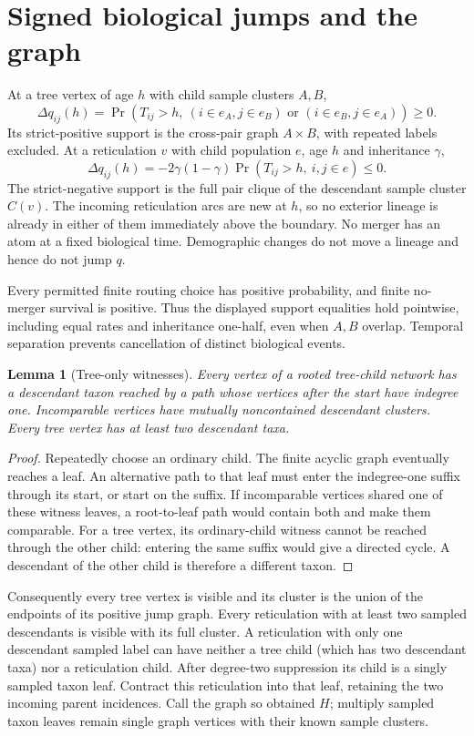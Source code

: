 \documentclass[11pt]{article}
\newtheorem{lemma}[theorem]{Lemma}
\begin{document}
\section{Signed biological jumps and the graph}
\label{sec:graph}
At a tree vertex of age $h$ with child sample clusters $A,B$,
\[
 \Delta q_{ij}(h)=\Pr(T_{ij}>h,\ (i\in e_A,j\in e_B)\text{ or }(i\in e_B,j\in e_A))\ge0.
\]
Its strict-positive support is the cross-pair graph $A\times B$, with repeated labels excluded. At a reticulation $v$ with child population $e$, age $h$ and inheritance $\gamma$,
\[
 \Delta q_{ij}(h)=-2\gamma(1-\gamma)\Pr(T_{ij}>h,\ i,j\in e)\le0.
\]
The strict-negative support is the full pair clique of the descendant sample cluster $C(v)$. The incoming reticulation arcs are new at $h$, so no exterior lineage is already in either of them immediately above the boundary. No merger has an atom at a fixed biological time. Demographic changes do not move a lineage and hence do not jump $q$.

Every permitted finite routing choice has positive probability, and finite no-merger survival is positive. Thus the displayed support equalities hold pointwise, including equal rates and inheritance one-half, even when $A,B$ overlap. Temporal separation prevents cancellation of distinct biological events.

\begin{lemma}[Tree-only witnesses]
\label{lem:witness}
Every vertex of a rooted tree-child network has a descendant taxon reached by a path whose vertices after the start have indegree one. Incomparable vertices have mutually noncontained descendant clusters. Every tree vertex has at least two descendant taxa.
\end{lemma}
\begin{proof}
Repeatedly choose an ordinary child. The finite acyclic graph eventually reaches a leaf. An alternative path to that leaf must enter the indegree-one suffix through its start, or start on the suffix. If incomparable vertices shared one of these witness leaves, a root-to-leaf path would contain both and make them comparable. For a tree vertex, its ordinary-child witness cannot be reached through the other child: entering the same suffix would give a directed cycle. A descendant of the other child is therefore a different taxon.
\end{proof}

Consequently every tree vertex is visible and its cluster is the union of the endpoints of its positive jump graph. Every reticulation with at least two sampled descendants is visible with its full cluster. A reticulation with only one descendant sampled label can have neither a tree child (which has two descendant taxa) nor a reticulation child. After degree-two suppression its child is a singly sampled taxon leaf. Contract this reticulation into that leaf, retaining the two incoming parent incidences. Call the graph so obtained $H$; multiply sampled taxon leaves remain single graph vertices with their known sample clusters.
\end{document}
